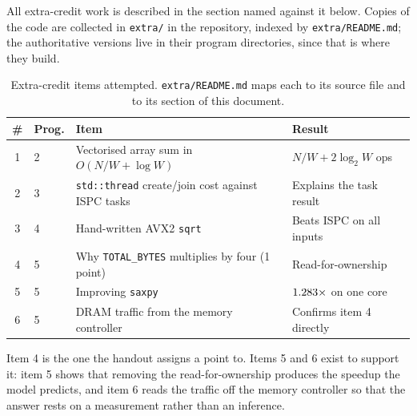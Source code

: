 \documentclass[11pt,a4paper]{article}
\begin{document}
All extra-credit work is described in the section named against it below.
Copies of the code are collected in \texttt{extra/} in the repository, indexed
by \texttt{extra/README.md}; the authoritative versions live in their program
directories, since that is where they build.

\begin{table}[H]
\centering
\begin{tabular}{clp{5.4cm}l}
\toprule
\# & Prog. & Item & Result \\
\midrule
1 & 2 & Vectorised array sum in $O(N/W + \log W)$ &
    $N/W + 2\log_2 W$ ops \\
2 & 3 & \texttt{std::thread} create/join cost against ISPC tasks &
    Explains the task result \\
3 & 4 & Hand-written AVX2 \texttt{sqrt} &
    Beats ISPC on all inputs \\
4 & 5 & Why \texttt{TOTAL\_BYTES} multiplies by four (1 point) &
    Read-for-ownership \\
5 & 5 & Improving \texttt{saxpy} &
    $1.283\times$ on one core \\
6 & 5 & DRAM traffic from the memory controller &
    Confirms item 4 directly \\
\bottomrule
\end{tabular}
\caption{Extra-credit items attempted. \texttt{extra/README.md} maps each to
its source file and to its section of this document.}
\end{table}

Item 4 is the one the handout assigns a point to. Items 5 and 6 exist to
support it: item 5 shows that removing the read-for-ownership produces the
speedup the model predicts, and item 6 reads the traffic off the memory
controller so that the answer rests on a measurement rather than an inference.
\end{document}
